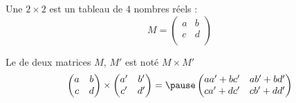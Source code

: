 \begin{frame}
Une  $2\times 2$ est un tableau de $4$ nombres réels :
$$M=\begin{pmatrix} a & b \\ c & d \\ \end{pmatrix}$$

\pause

Le  de deux matrices $M$, $M'$ est noté $M\times M'$ 
$$ \left(\begin{matrix} a & b \\ c & d \\ \end{matrix}\right) \times 
\left(\begin{matrix} a' & b' \\ c' & d' \\ \end{matrix}\right)
= 
\pause
\left(\begin{matrix} aa'+bc' & ab' + bd' \\ ca'+dc' & cb'+dd' \\ \end{matrix}\right)$$

\pause
\vspace{0cm}




\end{frame}
